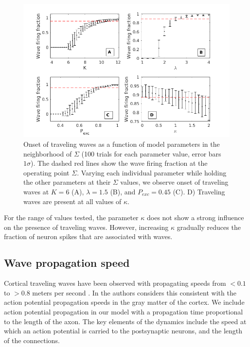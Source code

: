 \documentclass[12pt]{article}
\begin{document}
\begin{figure}[!htb]
 \centering
 \includegraphics[width=\textwidth]{fig/ParamWaveSim}
 \caption{Onset of traveling waves as a function of model parameters in the neighborhood of $\Sigma$ (100 trials for each parameter value, error bars $1\sigma$). 
         The dashed red lines show the wave firing fraction at the \color{red}operating \color{black} point $\Sigma$.  
         Varying each individual parameter while holding the other parameters at their $\Sigma$ values, we observe onset of traveling waves at $K=6$ (A), $\lambda=1.5$ (B), and $P_{exc}=0.45$ (C).  
         D) Traveling waves are present at all values of $\kappa$. }
 \label{fig:wave_parameters}
\end{figure}

\FloatBarrier

For the range of values tested, the parameter $\kappa$ does not show a strong influence on the presence of traveling waves. 
However, increasing $\kappa$ gradually reduces the fraction of neuron spikes that are associated with waves.

\subsection{Wave propagation speed} \label{sub:propagation_speed}
\color{red}Cortical traveling waves have been observed with propagating speeds from $<0.1$ to $>0.8$ meters per second \parencite{Sato2012}\parencite{Golomb1997}\parencite{Chervin1988}.
In \parencite{Muller2018} the authors considers this consistent with the action potential propagation speeds in the gray matter of the cortex. 
We include action potential propagation in our model with a propagation time proportional to the length of the axon\color{black}.
The key elements of the dynamics include the speed at which an action potential is carried to the postsynaptic neurons, and the length of the connections.
\end{document}
